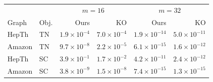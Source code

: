 \begin{tabular}{llrrrr}
\toprule
& & \multicolumn{2}{c}{$m=16$} & \multicolumn{2}{c}{$m=32$} \\
Graph & Obj. & Ours & KO & Ours & KO \\
\midrule
HepTh & TN & $1.9\times10^{-4}$ & $7.0\times10^{-4}$ & $1.9\times10^{-14}$ & $5.0\times10^{-11}$ \\
Amazon & TN & $9.7\times10^{-8}$ & $2.2\times10^{-5}$ & $6.1\times10^{-15}$ & $1.6\times10^{-12}$ \\
HepTh & SC & $3.9\times10^{-1}$ & $1.7\times10^{-2}$ & $4.2\times10^{-11}$ & $2.4\times10^{-12}$ \\
Amazon & SC & $3.8\times10^{-9}$ & $1.5\times10^{-8}$ & $7.4\times10^{-15}$ & $1.3\times10^{-15}$ \\
\bottomrule
\end{tabular}
